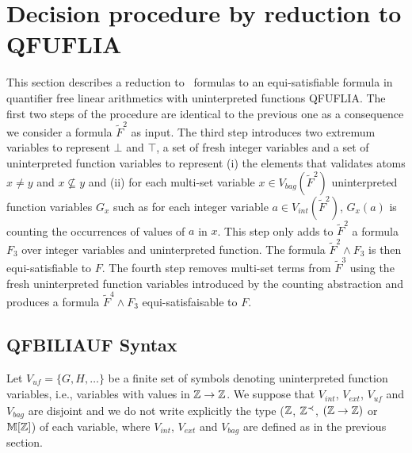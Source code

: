 
\section{Decision procedure by reduction to \textsf{QFUFLIA}}
\label{sec:forder}

This section describes a reduction to \QFBILIA\ formulas to an equi-satisfiable formula in quantifier free linear arithmetics with uninterpreted functions QFUFLIA.
The first two steps of the procedure are identical to the previous one as a consequence we consider a formula $\tilde{F}^2$ as input.
The third step introduces two extremum variables to represent $\bot$ and $\top$, a set of fresh integer variables and a set of uninterpreted function variables to represent
(i) the elements that validates atoms $x\neq y$ and $x\nsubseteq y$ and
(ii) for each multi-set variable $x\in V_{bag}(\tilde{F}^2)$ uninterpreted function variables
$G_{x}$ such as for each integer variable $a\in V_{int}(\tilde{F}^2)$, $G_{x}(a)$ is counting the occurrences of values of $a$ in $x$.
This step only adds to $\tilde{F}^2$ a formula $F_3$ over integer variables and uninterpreted function. The formula $\tilde{F}^2 \land F_3$ is then equi-satisfiable to $F$.
The fourth step removes multi-set terms from $\tilde{F}^3$ using the fresh uninterpreted function variables introduced by the counting abstraction and produces a formula $\tilde{F}^4 \land F_3$ equi-satisfaisable to $F$.


\subsection{QFBILIAUF Syntax}
\label{ssec:synUF}

Let $V_{\textit{uf}}=\{G,H,\ldots\}$ be a finite set of symbols denoting uninterpreted function variables, i.e., variables with values in $\mathbb{Z} \rightarrow \mathbb{Z}$.
We suppose that $V_{int}$, $V_{ext}$, $V_{\textit{uf}}$ and $V_{bag}$ are disjoint and we do not write explicitly the type ($\mathbb{Z}$, $\mathbb{Z}^{\prec}$, $(\mathbb{Z} \rightarrow \mathbb{Z})$ or $\mathbb{M}[\mathbb{Z}]$) of each variable,
where $V_{int}$, $V_{ext}$ and $V_{bag}$ are defined as in the previous section.

